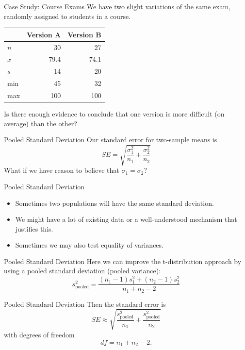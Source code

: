 \begin{frame}{Case Study: Course Exams}
    We have two slight variations of the same exam, randomly assigned to students in a course.
    \begin{table}[]
        \centering
        \begin{tabular}{lrr}
        \hline
                    & Version A & Version B \\
        \hline
        $n$         & 30    & 27 \\
        $\bar{x}$   & 79.4  & 74.1 \\
        $s$         & 14  & 20 \\
        min         & 45    & 32 \\
        max         & 100    & 100 \\
        \hline
        \end{tabular}
    \end{table}
    Is there enough evidence to conclude that one version is more difficult (on average) than the other?
\end{frame}

\begin{frame}{Pooled Standard Deviation}
    Our standard error for two-sample means is
    \[
        SE = \sqrt{\frac{\sigma_1^2}{n_1} + \frac{\sigma_2^2}{n_2}}
    \]
    What if we have reason to believe that $\sigma_1=\sigma_2$?
\end{frame}

\begin{frame}{Pooled Standard Deviation}
    \begin{itemize}
        \item Sometimes two populations will have the same standard deviation.
        \item We might have a lot of existing data or a well-understood mechanism that justifies this.
        \item Sometimes we may also test equality of variances.
    \end{itemize}
\end{frame}

\begin{frame}{Pooled Standard Deviation}
    Here we can improve the t-distribution approach by using a pooled standard deviation (pooled variance):
    \[
        s^2_{\text{pooled}} = \frac{(n_1-1)s_1^2 + (n_2-1)s_2^2}{n_1+n_2-2}
    \]
\end{frame}

\begin{frame}{Pooled Standard Deviation}
    Then the standard error is
    \[
        SE \approx \sqrt{\frac{s^2_{\text{pooled}}}{n_1} + \frac{s^2_{\text{pooled}}}{n_2}}
    \]
    with degrees of freedom
    \[
        df = n_1 + n_2 - 2.
    \]
\end{frame}
